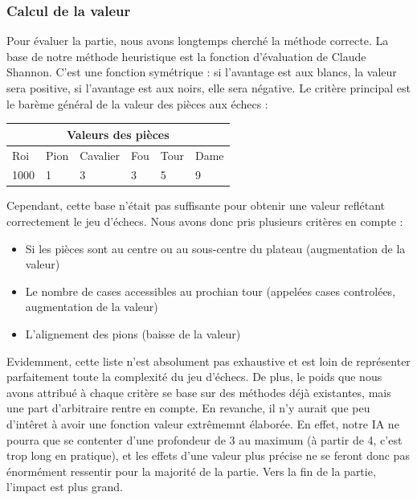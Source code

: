\documentclass{article}
\begin{document}
\subsubsection{Calcul de la valeur}

Pour évaluer la partie, nous avons longtemps cherché la méthode correcte. 
La base de notre méthode heuristique
est la fonction d'évaluation de Claude Shannon. C'est une fonction symétrique : si l'avantage est aux blancs,
la valeur sera positive, si l'avantage est aux noirs, elle sera négative.
Le critère principal est le barème général de la valeur des pièces aux échecs : \\

\begin{center}
\begin{tabular}{ |p{1cm}||p{1cm}|p{1.5cm}|p{1cm}|p{1cm}|p{1cm}|  }
    \hline
    \multicolumn{6}{|c|}{Valeurs des pièces} \\
    \hline 
    Roi&Pion&Cavalier&Fou&Tour&Dame \\ 
    \hline 
1000&1&3&3&5&9 \\
\hline
\end{tabular} 
\end{center}

Cependant, cette base n'était pas suffisante pour obtenir une valeur reflétant correctement le jeu d'échecs.
Nous avons donc pris plusieurs critères en compte :
\begin{itemize}
    \item Si les pièces sont au centre ou au sous-centre du plateau (augmentation de la valeur)
    \item Le nombre de cases accessibles au prochian tour (appelées cases controlées, augmentation de la valeur)
    \item L'alignement des pions (baisse de la valeur)
\end{itemize}

Evidemment, cette liste n'est absolument pas exhaustive et est loin de représenter parfaitement 
toute la complexité du jeu d'échecs. De plus, le poids que nous avons attribué à chaque critère se base
sur des méthodes déjà existantes, mais une part d'arbitraire rentre en compte. 
En revanche, il n'y aurait que peu d'intêret à avoir une fonction valeur extrêmemnt élaborée.
En effet, notre IA ne pourra que se contenter d'une profondeur de 3 au maximum (à partir de 4, c'est trop long en pratique),
et les effets d'une valeur plus précise ne se feront donc pas énormément ressentir pour la majorité de la partie.
Vers la fin de la partie, l'impact est plus grand.
\end{document}
